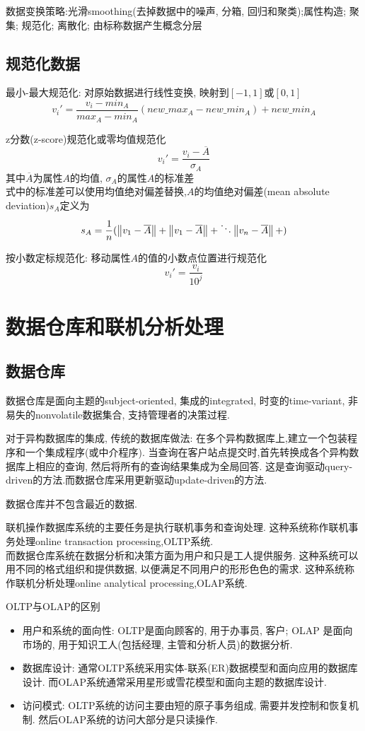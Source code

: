 \documentclass{article}
\begin{document}
数据变换策略:光滑smoothing(去掉数据中的噪声, 分箱, 回归和聚类);属性构造; 聚集; 规范化; 离散化; 由标称数据产生概念分层

\subsection{规范化数据}
最小-最大规范化: 对原始数据进行线性变换, 映射到$[-1,1]$或$[0,1]$
$$
v_i' = \dfrac{v_i - min_A }{max_A - min_A}(new\_max_A - new\_min_A) + new\_min_A
$$

z分数(z-score)规范化或零均值规范化
$$
v_i' = \dfrac{ v_i - \overline{A}}{\sigma_A}
$$
其中$\overline{A}$为属性$A$的均值, $\sigma_A$的属性$A$的标准差 \\
式中的标准差可以使用均值绝对偏差替换,$A$的均值绝对偏差(mean absolute deviation)$s_A$定义为
$$
s_A = \dfrac{1}{n}( \left\Vert v_1 - \overline{A}\right\Vert+ \left\Vert v_1 - \overline{A}\right\Vert+ \ddots \left\Vert v_n - \overline{A}\right\Vert+)
$$

按小数定标规范化: 移动属性$A$的值的小数点位置进行规范化
$$
v_i' = \dfrac{v_i}{10^j}
$$

\section{数据仓库和联机分析处理}
\subsection{数据仓库}
数据仓库是面向主题的subject-oriented, 集成的integrated, 时变的time-variant, 非易失的nonvolatile数据集合, 支持管理者的决策过程.

对于异构数据库的集成, 传统的数据库做法: 在多个异构数据库上,建立一个包装程序和一个集成程序(或中介程序). 当查询在客户站点提交时,首先转换成各个异构数据库上相应的查询, 然后将所有的查询结果集成为全局回答. 这是查询驱动query-driven的方法.而数据仓库采用更新驱动update-driven的方法.\par
数据仓库并不包含最近的数据.

联机操作数据库系统的主要任务是执行联机事务和查询处理. 这种系统称作联机事务处理online transaction processing,OLTP系统. \\
而数据仓库系统在数据分析和决策方面为用户和只是工人提供服务. 这种系统可以用不同的格式组织和提供数据, 以便满足不同用户的形形色色的需求. 这种系统称作联机分析处理online analytical processing,OLAP系统.\par
OLTP与OLAP的区别
\begin{itemize}
	\item 用户和系统的面向性: OLTP是面向顾客的, 用于办事员, 客户; OLAP 是面向市场的, 用于知识工人(包括经理, 主管和分析人员)的数据分析.
	\item 数据库设计: 通常OLTP系统采用实体-联系(ER)数据模型和面向应用的数据库设计. 而OLAP系统通常采用星形或雪花模型和面向主题的数据库设计.
	\item 访问模式: OLTP系统的访问主要由短的原子事务组成, 需要并发控制和恢复机制. 然后OLAP系统的访问大部分是只读操作.
\end{itemize}
\end{document}
